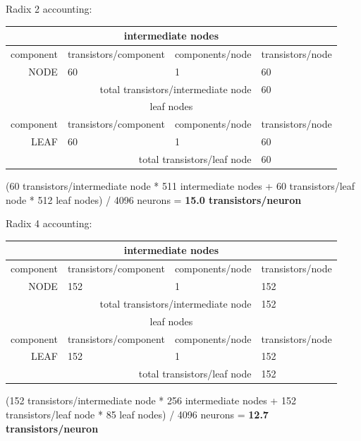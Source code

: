 \documentclass{article}
\begin{document}
\noindent
Radix 2 accounting:

\begin{center}
    \begin{tabular}{|r|l|l|l|}
    \hline \multicolumn{4}{|c|}{intermediate nodes} \\ \hline
    component & transistors/component & components/node & transistors/node \\ \hline
    NODE & 60 & 1 & 60 \\ \hline
    \hline \multicolumn{3}{|r|}{total transistors/intermediate node} & 60 \\ \hline
    \hline \multicolumn{4}{|c|}{leaf nodes} \\ \hline
    component & transistors/component & components/node & transistors/node \\ \hline
    LEAF & 60 & 1 & 60 \\ \hline
    \hline \multicolumn{3}{|r|}{total transistors/leaf node} & 60 \\ \hline
    \end{tabular}
\end{center}

(60 transistors/intermediate node * 511 intermediate nodes + 60 transistors/leaf node * 512 leaf nodes) / 4096 neurons = 
\textbf{15.0 transistors/neuron}

\noindent
Radix 4 accounting:

\begin{center}
    \begin{tabular}{|r|l|l|l|}
    \hline \multicolumn{4}{|c|}{intermediate nodes} \\ \hline
    component & transistors/component & components/node & transistors/node \\ \hline
    NODE & 152 & 1 & 152 \\ \hline
    \hline \multicolumn{3}{|r|}{total transistors/intermediate node} & 152 \\ \hline
    \hline \multicolumn{4}{|c|}{leaf nodes} \\ \hline
    component & transistors/component & components/node & transistors/node \\ \hline
    LEAF & 152 & 1 & 152 \\ \hline
    \hline \multicolumn{3}{|r|}{total transistors/leaf node} & 152 \\ \hline
    \end{tabular}
\end{center}

(152 transistors/intermediate node * 256 intermediate nodes + 152 transistors/leaf node * 85 leaf nodes) / 4096 neurons = 
\textbf{12.7 transistors/neuron}
\end{document}
